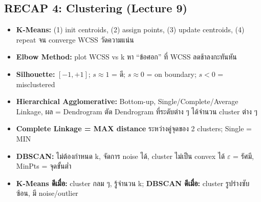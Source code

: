 \documentclass[a4paper,12pt]{article}
\begin{document}
\subsection*{RECAP 4: Clustering (Lecture 9)}
\begin{itemize}
    \item \textbf{K-Means:} (1) init centroids, (2) assign points, (3) update centroids, (4) repeat จน converge WCSS วัดความแน่น
    \item \textbf{Elbow Method:} plot WCSS vs k หา ``ข้อศอก'' ที่ WCSS ลดช้าลงกะทันหัน
    \item \textbf{Silhouette:} $[-1,+1]$; $s \approx 1$ = ดี; $s \approx 0$ = on boundary; $s < 0$ = misclustered
    \item \textbf{Hierarchical Agglomerative:} Bottom-up, Single/Complete/Average Linkage, ผล = Dendrogram ตัด Dendrogram ที่ระดับต่าง ๆ ได้จำนวน cluster ต่าง ๆ
    \item \textbf{Complete Linkage = MAX distance} ระหว่างคู่จุดของ 2 clusters; Single = MIN
    \item \textbf{DBSCAN:} ไม่ต้องกำหนด k, จัดการ noise ได้, cluster ไม่เป็น convex ได้ $\varepsilon$ = รัศมี, MinPts = จุดขั้นต่ำ
    \item \textbf{K-Means ดีเมื่อ:} cluster กลม ๆ, รู้จำนวน k; \textbf{DBSCAN ดีเมื่อ:} cluster รูปร่างซับซ้อน, มี noise/outlier
\end{itemize}
\end{document}
